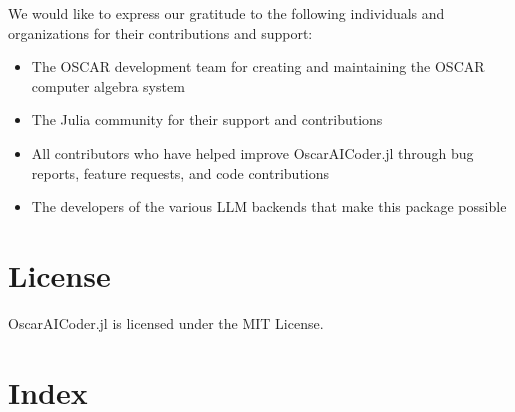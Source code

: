 \documentclass[11pt,a4paper]{article}
\begin{document}
We would like to express our gratitude to the following individuals and organizations for their contributions and support:

\begin{itemize}
    \item The OSCAR development team for creating and maintaining the OSCAR computer algebra system
    \item The Julia community for their support and contributions
    \item All contributors who have helped improve OscarAICoder.jl through bug reports, feature requests, and code contributions
    \item The developers of the various LLM backends that make this package possible
\end{itemize}

\section{License}
\label{sec:license}

OscarAICoder.jl is licensed under the MIT License.

\clearpage
\section*{Index}
\printindex
\end{document}
